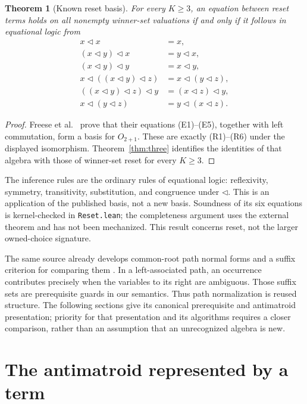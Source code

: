 \documentclass[11pt]{article}
\newtheorem{theorem}{Theorem}[section]
\newcommand{\del}{\mathbin{\triangleleft}}
\begin{document}
\begin{theorem}[Known reset basis]\label{thm:basis}
For every $K\geq3$, an equation between reset terms holds on all
nonempty winner-set valuations if and only if it follows in equational
logic from
\begin{align*}
 x\del x&=x,\tag{R1}\\
 (x\del y)\del x&=y\del x,\tag{R2}\\
 (x\del y)\del y&=x\del y,\tag{R3}\\
 x\del((x\del y)\del z)&=x\del(y\del z),\tag{R4}\\
 ((x\del y)\del z)\del y&=(x\del z)\del y,\tag{R5}\\
 x\del(y\del z)&=y\del(x\del z).\tag{R6}
\end{align*}
\end{theorem}
\begin{proof}
Freese et al.\ \cite[Theorem~3.7]{FreeseEtAl2002} prove that their
equations (E1)--(E5), together with left commutation, form a basis for
$O_{2+1}$. These are exactly (R1)--(R6) under the displayed isomorphism.
Theorem~\ref{thm:three} identifies the identities of that algebra with
those of winner-set reset for every $K\geq3$.
\end{proof}

The inference rules are the ordinary rules of equational logic:
reflexivity, symmetry, transitivity, substitution, and congruence under
$\del$. This is an application of the published basis, not a new basis.
Soundness of its six equations is kernel-checked in \texttt{Reset.lean};
the completeness argument uses the external theorem and has not been
mechanized. This result concerns reset, not the larger owned-choice
signature.

The same source already develops common-root path normal forms and a
suffix criterion for comparing them
\cite[Lemmas~3.5--3.6]{FreeseEtAl2002}. In a left-associated path, an
occurrence contributes precisely when the variables to its right are
ambiguous. Those suffix sets are prerequisite guards in our semantics.
Thus path normalization is reused structure. The following sections
give its canonical prerequisite and antimatroid presentation; priority
for that presentation and its algorithms requires a closer comparison,
rather than an assumption that an unrecognized algebra is new.

\section{The antimatroid represented by a term}
\end{document}
